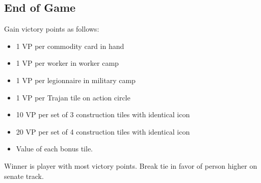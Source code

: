 \documentclass[10pt]{article}
\newenvironment{itemizeCustom}
{\begin{itemize}
  \setlength{\itemsep}{1pt}
  \setlength{\parskip}{0pt}
  \setlength{\parsep}{0pt}}
{\end{itemize}}
\begin{document}
\begin{multicols*}{2}
\section*{End of Game}
Gain victory points as follows:
\begin{itemizeCustom}
    \item 1 VP per commodity card in hand
    \item 1 VP per worker in worker camp
    \item 1 VP per legionnaire in military camp
    \item 1 VP per Trajan tile on action circle
    \item 10 VP per set of 3 construction tiles with identical icon
    \item 20 VP per set of 4 construction tiles with identical icon
    \item Value of each bonus tile.
\end{itemizeCustom}

Winner is player with most victory points. Break tie in favor of person higher on senate track.

\end{multicols*}
\end{document}
